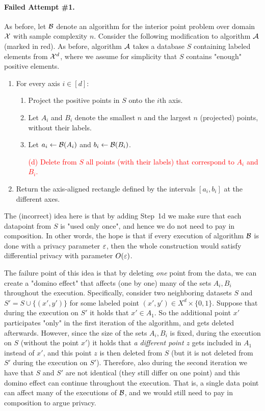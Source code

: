 \documentclass[12pt,a4paper,oneside,onecolumn]{book}
\begin{document}
\paragraph{Failed Attempt \#1.}
As before, let $\mathcal{B}$ denote an algorithm for the interior point problem over domain $\mathcal{X}$ with sample complexity $n$. Consider the following modification to algorithm $\mathcal{A}$ (marked in red). As before, algorithm $\mathcal{A}$ takes a database $S$ containing labeled elements from $\mathcal{X}^d$, where we assume for simplicity that $S$ contains "enough" positive elements.
\begin{enumerate}[leftmargin=15pt]
    \item For every axis $i\in[d]$:
        \begin{enumerate}
        \item Project the positive points in $S$ onto the $i$th axis.
        \item Let $A_i$ and $B_i$ denote the smallest $n$ and the largest $n$ (projected) points, without their labels.
        \item Let $a_i\leftarrow\mathcal{B}(A_i)$ and $b_i\leftarrow\mathcal{B}(B_i)$.
        \item[\textcolor{red}{(d)}] \textcolor{red}{Delete from $S$ all points (with their labels) that correspond to $A_i$ and $B_i$.}
    \end{enumerate}
    \item Return the axis-aligned rectangle defined by the intervals $[a_i,b_i]$ at the different axes.
\end{enumerate}

The (incorrect) idea here is that by adding Step~1d we make sure that each datapoint from $S$ is "used only once", and hence we do not need to pay in composition. In other words, the hope is that if every execution of algorithm $\mathcal{B}$ is done with a privacy parameter $\varepsilon$, then the whole construction would satisfy differential privacy with parameter $O(\varepsilon)$.

The failure point of this idea is that by deleting {\em one} point from the data, we can create a "domino effect" that affects (one by one) many of the sets $A_i,B_i$ throughout the execution. 
Specifically, consider two neighboring datasets $S$ and $S'=S\cup\{(x',y')\}$ for some labeled point $(x',y')\in X^d\times\{0,1\}$. Suppose that during the execution on $S'$ it holds that $x'\in A_1$. So the additional point $x'$ participates "only" in the first iteration of the algorithm, and gets deleted afterwards. However, since the size of the sets $A_i,B_i$ is fixed, during the execution on $S$ (without the point $x'$) it holds that {\em a different point $z$} gets included in $A_1$ instead of $x'$, and this point $z$ is then deleted from $S$ (but it is not deleted from $S'$ during the execution on $S'$). Therefore, also during the second iteration we have that $S$ and $S'$ are not identical (they still differ on one point) and this domino effect can continue throughout the execution. That is, a single data point can affect many of the executions of $\mathcal{B}$, and we would still need to pay in composition to argue privacy.
\end{document}
